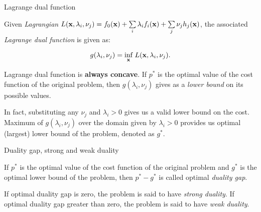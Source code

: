 \documentclass{beamer}
\begin{document}
\begin{frame}{Lagrange dual function}
	\begin{flushleft}
		
	Given \emph{Lagrangian} $L(\mathbf{x}, \lambda_i, \nu_j) = 
	f_0(\mathbf{x}) + 
	\sum\limits_i \lambda_i f_i(\mathbf{x}) +
	\sum\limits_j \nu_j h_j(\mathbf{x})$, the associated 
	 \emph{Lagrange dual function} is given as:
		
		\begin{equation}
			g(\lambda_i, \nu_j)  = \underset{\mathbf{x}}{\text{inf}}
			\ L(\mathbf{x}, \lambda_i, \nu_j).
		\end{equation}
		
		Lagrange dual function is \textbf{always concave}. If $p^*$ is the optimal value of the cost function of the original problem, then $g(\lambda_i, \nu_j)$ gives as a \emph{lower bound} on its possible values. 
		
		\bigskip
		
		In fact, substituting any $\nu_j$ and $\lambda_i > 0$ gives us a valid lower bound on the cost. Maximum of $g(\lambda_i, \nu_j)$ over the domain given by $\lambda_i > 0$ provides us optimal (largest) lower bound of the problem, denoted as $g^*$. 
		
	\end{flushleft}
\end{frame}



\begin{frame}{Duality gap, strong and weak duality}
	\begin{flushleft}
		
		If $p^*$ is the optimal value of the cost function of the original problem and $g^*$ is the optimal lower bound of the problem, then $p^* - g^*$ is called optimal \emph{duality gap}.
		
		\bigskip
		
		If optimal duality gap is zero, the problem is said to have \emph{strong duality}. If optimal duality gap greater than zero, the problem is said to have \emph{weak duality}.
		
	\end{flushleft}
\end{frame}
\end{document}
